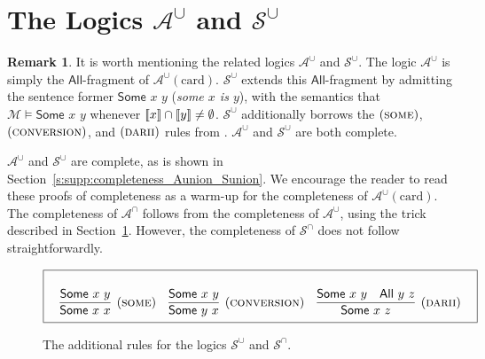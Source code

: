 \documentclass[letterpaper]{article}
\theoremstyle{definition}
\newtheorem{remark}[theorem]{Remark}
\newcommand{\semantics}[1]{[\![\mbox{\em $ #1 $\/}]\!]}
\newcommand{\Model}{\mathcal{M}}
\newcommand{\Aunion}{\mathscr{A}^{\cup}}
\newcommand{\Sunion}{\mathscr{S}^{\cup}}
\newcommand{\Ainter}{\mathscr{A}^{\cap}}
\newcommand{\Sinter}{\mathscr{S}^{\cap}}
\newcommand{\proverule}{\textsc}
\newcommand{\some}{\proverule{some}}
\newcommand{\conversion}{\proverule{conversion}}
\newcommand{\darii}{\proverule{darii}}
\newcommand{\All}[2]{\mathsf{All}\,\,#1\,\,#2}
\newcommand{\Some}[2]{\mathsf{Some}\,\,#1\,\,#2}
\newcommand{\AllNoArgs}{\mathsf{All}}
\newcommand{\card}{\mathrm{card}}
\begin{document}
\section{The Logics $\Aunion$ and $\Sunion$}

\begin{remark}
It is worth mentioning the related logics $\Aunion$ and $\Sunion$.  The logic $\Aunion$ is simply the $\AllNoArgs$-fragment of $\Aunion(\card)$.  $\Sunion$ extends this $\AllNoArgs$-fragment by admitting the sentence former $\Some{x}{y}$ (\emph{some $x$ is $y$}), with the semantics that $\Model \models \Some{x}{y}$ whenever $\semantics{x} \cap \semantics{y} \ne \emptyset$.  $\Sunion$ additionally %
borrows the $(\some)$, $(\conversion)$, and $(\darii)$ rules
from \cite{syllogistic_cardinality_comparisons}.  %
$\Aunion$ and $\Sunion$ are both complete. %


$\Aunion$ and $\Sunion$ are complete, as is shown in Section~\ref{s:supp:completeness_Aunion_Sunion}.  We encourage the reader to read these proofs of completeness as a warm-up for the completeness of $\Aunion(\card)$.  The completeness of $\Ainter$ follows from the completeness of $\Aunion$, using the trick described in Section~\ref{}.  However, the completeness of $\Sinter$ does not follow straightforwardly.

\label{remark-related-logics}
\end{remark}

\begin{figure*}[t]
\begin{equation*}
\boxed{
\begin{array}{c}
\begin{array}{ccc}
\\ 
\infer[(\some)]
    {\Some{x}{x}}
    {\Some{x}{y}} 
&
\infer[(\conversion)]
    {\Some{y}{x}}
    {\Some{x}{y}}
&
\infer[(\darii)]
    {\Some{x}{z}}
    {\Some{x}{y} & \All{y}{z}}
\end{array}
\\
\end{array}
}
\end{equation*}
\caption{The additional rules for the logics $\Sunion$ and $\Sinter$.
\label{fig-rules-some}}
\end{figure*}
\end{document}

